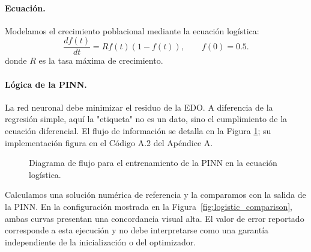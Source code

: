\paragraph{Ecuación.} Modelamos el crecimiento poblacional mediante la ecuación logística:
\[
\frac{d f(t)}{d t}=Rf(t)(1-f(t)), \qquad f(0)=0.5.
\]
donde $R$ es la tasa máxima de crecimiento.

\paragraph{Lógica de la PINN.} La red neuronal debe minimizar el residuo de la EDO. A diferencia de la regresión simple, aquí la "etiqueta" no es un dato, sino el cumplimiento de la ecuación diferencial. El flujo de información se detalla en la Figura \ref{fig:flowchart_logistic}; su implementación figura en el Código A.2 del Apéndice A.

\begin{figure}[h!]
\centering
{}
\caption{Diagrama de flujo para el entrenamiento de la PINN en la ecuación logística.}
\label{fig:flowchart_logistic}
\end{figure}

Calculamos una solución numérica de referencia y la comparamos con la salida de la PINN. En la configuración mostrada en la Figura~\ref{fig:logistic_comparison}, ambas curvas presentan una concordancia visual alta. El valor de error reportado corresponde a esta ejecución y no debe interpretarse como una garantía independiente de la inicialización o del optimizador.


